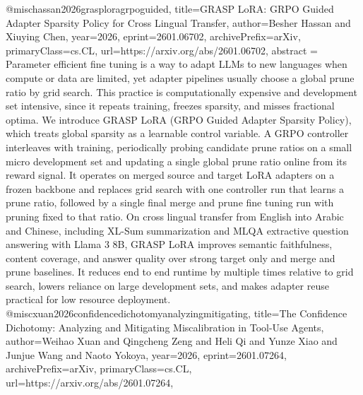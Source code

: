 {}@misc{hassan2026grasploragrpoguided,
      title={GRASP LoRA: GRPO Guided Adapter Sparsity Policy for Cross Lingual Transfer}, 
      author={Besher Hassan and Xiuying Chen},
      year={2026},
      eprint={2601.06702},
      archivePrefix={arXiv},
      primaryClass={cs.CL},
      url={https://arxiv.org/abs/2601.06702},
      abstract = {Parameter efficient fine tuning is a way to adapt LLMs to new languages when compute or data are limited, yet adapter pipelines usually choose a global prune ratio by grid search. This practice is computationally expensive and development set intensive, since it repeats training, freezes sparsity, and misses fractional optima. We introduce GRASP LoRA (GRPO Guided Adapter Sparsity Policy), which treats global sparsity as a learnable control variable. A GRPO controller interleaves with training, periodically probing candidate prune ratios on a small micro development set and updating a single global prune ratio online from its reward signal. It operates on merged source and target LoRA adapters on a frozen backbone and replaces grid search with one controller run that learns a prune ratio, followed by a single final merge and prune fine tuning run with pruning fixed to that ratio. On cross lingual transfer from English into Arabic and Chinese, including XL-Sum summarization and MLQA extractive question answering with Llama 3 8B, GRASP LoRA improves semantic faithfulness, content coverage, and answer quality over strong target only and merge and prune baselines. It reduces end to end runtime by multiple times relative to grid search, lowers reliance on large development sets, and makes adapter reuse practical for low resource deployment.}
}@misc{xuan2026confidencedichotomyanalyzingmitigating,
      title={The Confidence Dichotomy: Analyzing and Mitigating Miscalibration in Tool-Use Agents}, 
      author={Weihao Xuan and Qingcheng Zeng and Heli Qi and Yunze Xiao and Junjue Wang and Naoto Yokoya},
      year={2026},
      eprint={2601.07264},
      archivePrefix={arXiv},
      primaryClass={cs.CL},
      url={https://arxiv.org/abs/2601.07264},
}
